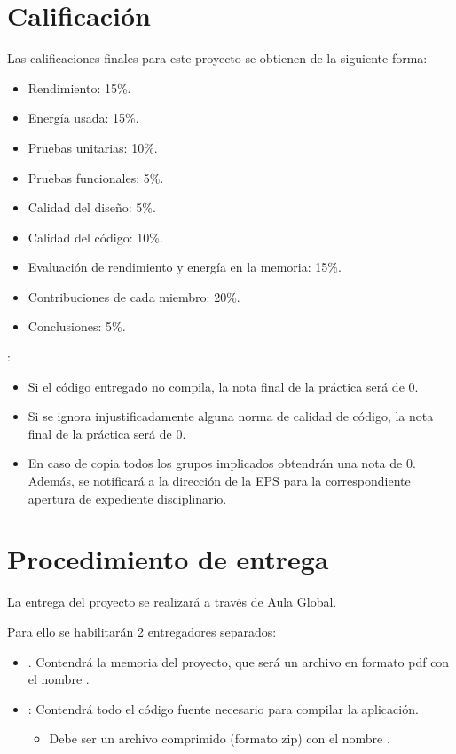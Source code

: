 \section{Calificación}

Las calificaciones finales para este proyecto se obtienen de la siguiente forma:

\begin{itemize}
  \item Rendimiento: 15\%.
  \item Energía usada: 15\%.
  \item Pruebas unitarias: 10\%.
  \item Pruebas funcionales: 5\%.
  \item Calidad del diseño: 5\%.
  \item Calidad del código: 10\%.
  \item Evaluación de rendimiento y energía en la memoria: 15\%.
  \item Contribuciones de cada miembro: 20\%.
  \item Conclusiones: 5\%.  
\end{itemize}

:

\begin{itemize}
  \item Si el código entregado no compila, la nota final de la práctica será de 0. 
  \item Si se ignora injustificadamente alguna norma de calidad de código,
        la nota final de la práctica será de 0.
  \item En caso de copia todos los grupos implicados obtendrán una nota de 0.
        Además, se notificará a la dirección de la EPS para la correspondiente
        apertura de expediente disciplinario.
\end{itemize}

\section{Procedimiento de entrega}

La entrega del proyecto se realizará a través de Aula Global.

Para ello se habilitarán 2 entregadores separados:

\begin{itemize}

\item {}. Contendrá la memoria del proyecto, que será
un archivo en formato pdf con el nombre .

\item {}: Contendrá todo el código fuente
necesario para compilar la aplicación.
\begin{itemize}
  \item Debe ser un archivo comprimido (formato zip) con el nombre
        .
\end{itemize}

\end{itemize}

